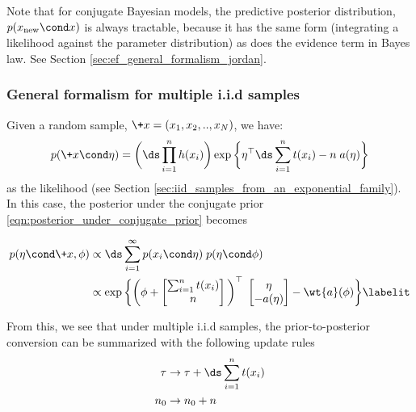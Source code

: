 \begin{remark}
Note that for conjugate Bayesian models, the predictive posterior distribution, $p(x_{\text{new}} \cond x)$ is always tractable, because it has the same form (integrating a likelihood against the parameter distribution) as does the evidence term in Bayes law.   See Section \ref{sec:ef_general_formalism_jordan}.
\end{remark}

\subsubsection{General formalism for multiple i.i.d samples} Given a random sample, $\+x=(x_1, x_2, .., x_N)$, we have:
\[ p(\+x \cond \eta) = \bigg( \ds\prod_{i=1}^n h(x_i)  \bigg) \exp \bigg\{ \eta^\top  \ds\sum_{i=1}^n \sufficientStatsFunction(x_i) - n \; \logNormalizerFunction(\eta) \bigg\} \]
as the likelihood (see Section \ref{sec:iid_samples_from_an_exponential_family}). In this case, the posterior under the conjugate prior \eqref{eqn:posterior_under_conjugate_prior} becomes

\begin{align*}
p(\eta \cond \+x, \phi) & \propto \ds\sum_{i=1}^\infty p(x_i \cond \eta) \; p(\eta \cond \phi) \\
&\propto \exp \bigg\{ \bigg( \phi + 
\begin{bmatrix} 
\sum_{i=1}^n \sufficientStatsFunction(x_i) \\
n \\
\end{bmatrix} \bigg)^\top \; 
\begin{bmatrix} 
\eta \\
-\logNormalizerFunction(\eta)
\end{bmatrix} 
- \wt{\logNormalizerFunction}(\phi)  \bigg\} 
\labelit \label{eqn:general_formalism_prior_to_posterior_conversion_after_multiple_iid_samples}
\end{align*}


From this, we see that under multiple i.i.d samples, the prior-to-posterior conversion can be summarized with the following update rules
\begin{subequations}
	\begin{align}
\tau & \to \tau + \ds\sum_{i=1}^n \sufficientStatsFunction(x_i) \\
n_0 & \to  n_0 + n 
\end{align} \label{eqn:general_formalism_prior_to_posterior_conversion}
\end{subequations}

